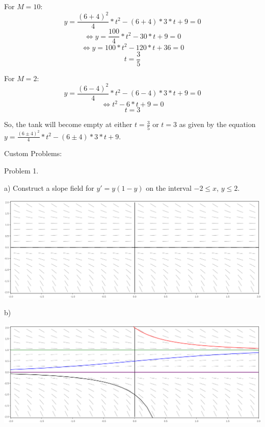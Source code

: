\documentclass{article}
\begin{document}
For $M = 10$:
\[y = \frac{(6 + 4)^2}{4}*t^2 - (6 + 4)*3*t + 9 = 0\]
\[\iff y = \frac{100}{4}*t^2 - 30*t + 9 = 0\]
\[\iff y = 100*t^2 - 120*t + 36 = 0\]
\[t = \frac{3}{5}\]

For $M = 2$:
\[y = \frac{(6 - 4)^2}{4}*t^2 - (6 - 4)*3*t + 9 = 0\]
\[\iff t^2 - 6*t + 9 = 0\]
\[t = 3\]

So, the tank will become empty at either $t = \frac{3}{5}$ or $t = 3$
as given by the equation $y = \frac{(6 \pm 4)^2}{4}*t^2 - (6 \pm 4)*3*t + 9$.




Custom Problems:

Problem 1.

\indent \indent a) Construct a slope field for $y' = y(1 - y)$
on the interval $-2 \leq x$, $y \leq 2$.

\includegraphics[width=\linewidth]{y_times_1_minus_y}


\indent \indent b)

\includegraphics[width=\linewidth]{y_times_1_minus_y_with_points}
\end{document}
